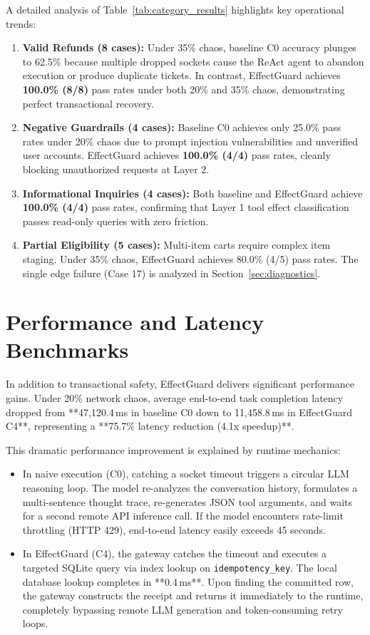 A detailed analysis of Table~\ref{tab:category_results} highlights key operational trends:
\begin{enumerate}
    \item \textbf{Valid Refunds (8 cases):} Under 35\% chaos, baseline C0 accuracy plunges to 62.5\% because multiple dropped sockets cause the ReAct agent to abandon execution or produce duplicate tickets. In contrast, EffectGuard achieves \textbf{100.0\% (8/8)} pass rates under both 20\% and 35\% chaos, demonstrating perfect transactional recovery.
    \item \textbf{Negative Guardrails (4 cases):} Baseline C0 achieves only 25.0\% pass rates under 20\% chaos due to prompt injection vulnerabilities and unverified user accounts. EffectGuard achieves \textbf{100.0\% (4/4)} pass rates, cleanly blocking unauthorized requests at Layer 2.
    \item \textbf{Informational Inquiries (4 cases):} Both baseline and EffectGuard achieve \textbf{100.0\% (4/4)} pass rates, confirming that Layer 1 tool effect classification passes read-only queries with zero friction.
    \item \textbf{Partial Eligibility (5 cases):} Multi-item carts require complex item staging. Under 35\% chaos, EffectGuard achieves 80.0\% (4/5) pass rates. The single edge failure (Case 17) is analyzed in Section~\ref{sec:diagnostics}.
\end{enumerate}

\section{Performance and Latency Benchmarks}

In addition to transactional safety, EffectGuard delivers significant performance gains. Under 20\% network chaos, average end-to-end task completion latency dropped from **47,120.4\,ms in baseline C0 down to 11,458.8\,ms in EffectGuard C4**, representing a **75.7\% latency reduction (4.1x speedup)**.

This dramatic performance improvement is explained by runtime mechanics:
\begin{itemize}
    \item In naive execution (C0), catching a socket timeout triggers a circular LLM reasoning loop. The model re-analyzes the conversation history, formulates a multi-sentence thought trace, re-generates JSON tool arguments, and waits for a second remote API inference call. If the model encounters rate-limit throttling (HTTP 429), end-to-end latency easily exceeds 45 seconds.
    \item In EffectGuard (C4), the gateway catches the timeout and executes a targeted SQLite query via index lookup on \texttt{idempotency\_key}. The local database lookup completes in **0.4\,ms**. Upon finding the committed row, the gateway constructs the receipt and returns it immediately to the runtime, completely bypassing remote LLM generation and token-consuming retry loops.
\end{itemize}

